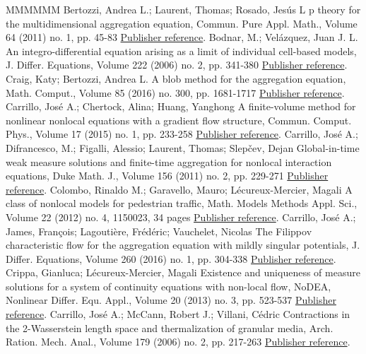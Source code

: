 \documentclass[11pt]{article}
\theoremstyle{definition}
\numberwithin{equation}{section}
\begin{document}
\begin{thebibliography}{MMMMMM}
 Bertozzi, Andrea L.; Laurent, Thomas; Rosado, Jesús L p  theory for the multidimensional aggregation equation, Commun. Pure Appl. Math., Volume 64 (2011) no. 1, pp. 45-83 \href{https://ahl.centre-mersenne.org/item/AHL_2020__3__217_0/#Bertozzi2}{Publisher reference}.
 Bodnar, M.; Velázquez, Juan J. L. An integro-differential equation arising as a limit of individual cell-based models, J. Differ. Equations, Volume 222 (2006) no. 2, pp. 341-380 \href{https://ahl.centre-mersenne.org/item/AHL_2020__3__217_0/#BV}{Publisher reference}.
 Craig, Katy; Bertozzi, Andrea L. A blob method for the aggregation equation, Math. Comput., Volume 85 (2016) no. 300, pp. 1681-1717 \href{https://ahl.centre-mersenne.org/item/AHL_2020__3__217_0/#CB}{Publisher reference}.
 Carrillo, José A.; Chertock, Alina; Huang, Yanghong A finite-volume method for nonlinear nonlocal equations with a gradient flow structure, Commun. Comput. Phys., Volume 17 (2015) no. 1, pp. 233-258 \href{https://ahl.centre-mersenne.org/item/AHL_2020__3__217_0/#CCH}{Publisher reference}.
 Carrillo, José A.; Difrancesco, M.; Figalli, Alessio; Laurent, Thomas; Slepčev, Dejan Global-in-time weak measure solutions and finite-time aggregation for nonlocal interaction equations, Duke Math. J., Volume 156 (2011) no. 2, pp. 229-271 \href{https://ahl.centre-mersenne.org/item/AHL_2020__3__217_0/#Carrillo}{Publisher reference}.
 Colombo, Rinaldo M.; Garavello, Mauro; Lécureux-Mercier, Magali A class of nonlocal models for pedestrian traffic, Math. Models Methods Appl. Sci., Volume 22 (2012) no. 4, 1150023, 34 pages \href{https://ahl.centre-mersenne.org/item/AHL_2020__3__217_0/#pieton}{Publisher reference}.
 Carrillo, José A.; James, François; Lagoutière, Frédéric; Vauchelet, Nicolas The Filippov characteristic flow for the aggregation equation with mildly singular potentials, J. Differ. Equations, Volume 260 (2016) no. 1, pp. 304-338 \href{https://ahl.centre-mersenne.org/item/AHL_2020__3__217_0/#CJLV}{Publisher reference}.
 Crippa, Gianluca; Lécureux-Mercier, Magali Existence and uniqueness of measure solutions for a system of continuity equations with non-local flow, NoDEA, Nonlinear Differ. Equ. Appl., Volume 20 (2013) no. 3, pp. 523-537 \href{https://ahl.centre-mersenne.org/item/AHL_2020__3__217_0/#pieton2}{Publisher reference}.
 Carrillo, José A.; McCann, Robert J.; Villani, Cédric Contractions in the 2-Wasserstein length space and thermalization of granular media, Arch. Ration. Mech. Anal., Volume 179 (2006) no. 2, pp. 217-263 \href{https://ahl.centre-mersenne.org/item/AHL_2020__3__217_0/#CCV}{Publisher reference}.

\end{thebibliography}
\end{document}

